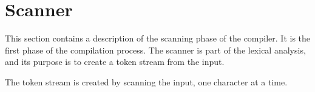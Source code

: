 \section{Scanner}
This section contains a description of the scanning phase of the compiler. It is the first phase of the compilation process. The scanner is part of the lexical analysis, and its purpose is to create a token stream from the input.

The token stream is created by scanning the input, one character at a time. 
 
